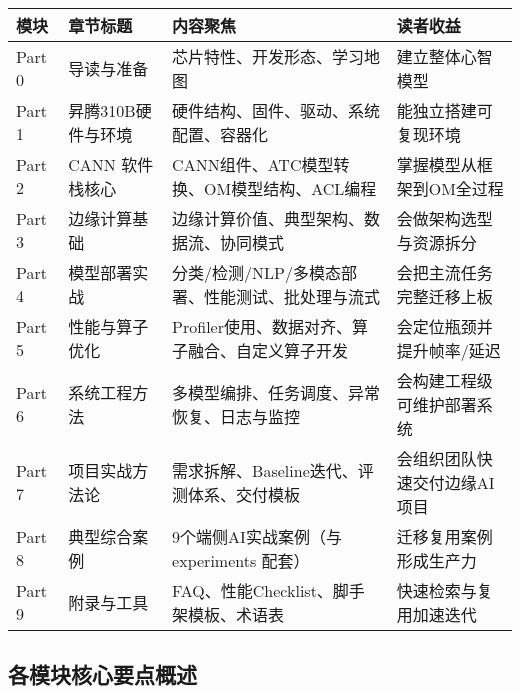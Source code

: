 \begin{longtable}[]{@{}
  >{\raggedright\arraybackslash}p{}
  >{\raggedright\arraybackslash}p{}
  >{\raggedright\arraybackslash}p{}
  >{\raggedright\arraybackslash}p{}@{}}
\toprule\noalign{}
\begin{minipage}[b]{\linewidth}\raggedright
模块
\end{minipage} & \begin{minipage}[b]{\linewidth}\raggedright
章节标题
\end{minipage} & \begin{minipage}[b]{\linewidth}\raggedright
内容聚焦
\end{minipage} & \begin{minipage}[b]{\linewidth}\raggedright
读者收益
\end{minipage} \\
\midrule\noalign{}
\endhead
\bottomrule\noalign{}
\endlastfoot
Part 0 & 导读与准备 & 芯片特性、开发形态、学习地图 & 建立整体心智模型 \\
Part 1 & 昇腾310B硬件与环境 & 硬件结构、固件、驱动、系统配置、容器化 &
能独立搭建可复现环境 \\
Part 2 & CANN 软件栈核心 & CANN组件、ATC模型转换、OM模型结构、ACL编程 &
掌握模型从框架到OM全过程 \\
Part 3 & 边缘计算基础 & 边缘计算价值、典型架构、数据流、协同模式 &
会做架构选型与资源拆分 \\
Part 4 & 模型部署实战 & 分类/检测/NLP/多模态部署、性能测试、批处理与流式
& 会把主流任务完整迁移上板 \\
Part 5 & 性能与算子优化 &
Profiler使用、数据对齐、算子融合、自定义算子开发 &
会定位瓶颈并提升帧率/延迟 \\
Part 6 & 系统工程方法 & 多模型编排、任务调度、异常恢复、日志与监控 &
会构建工程级可维护部署系统 \\
Part 7 & 项目实战方法论 & 需求拆解、Baseline迭代、评测体系、交付模板 &
会组织团队快速交付边缘AI项目 \\
Part 8 & 典型综合案例 & 9个端侧AI实战案例（与 experiments 配套） &
迁移复用案例形成生产力 \\
Part 9 & 附录与工具 & FAQ、性能Checklist、脚手架模板、术语表 &
快速检索与复用加速迭代 \\
\end{longtable}

\subsection*{各模块核心要点概述}\label{各模块核心要点概述}

